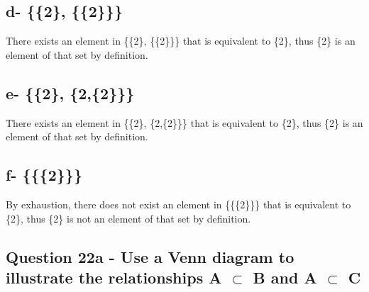 \documentclass{article}
\begin{document}
\subsection[d]{d- \{\{2\}, \{\{2\}\}\}}
There exists an element in \{\{2\}, \{\{2\}\}\} that is equivalent to \{2\}, thus \{2\} is an element of that set by definition.
\subsection[e]{e- \{\{2\}, \{2,\{2\}\}\}}
There exists an element in \{\{2\}, \{2,\{2\}\}\} that is equivalent to \{2\}, thus \{2\} is an element of that set by definition.
\subsection[f]{f- \{\{\{2\}\}\}}
By exhaustion, there does not exist an element in \{\{\{2\}\}\} that is equivalent to \{2\}, thus \{2\} is not an element of that set by definition.

\subsection{Question 22a - Use a Venn diagram to illustrate the relationships A $\subset$ B and A $\subset$ C}
\end{document}
